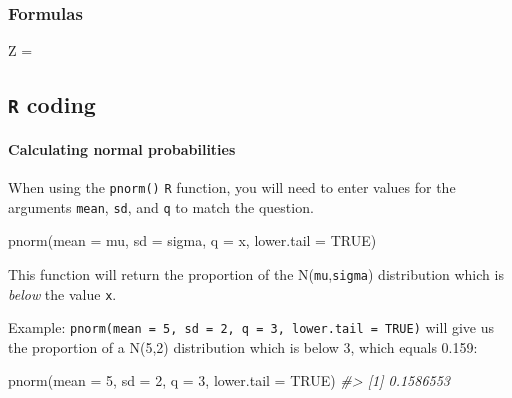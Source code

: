 \documentclass[
]{report}
\newenvironment{Shaded}{\begin{snugshade}}{\end{snugshade}}
\newcommand{\AttributeTok}[1]{\textcolor[rgb]{0.77,0.63,0.00}{#1}}
\newcommand{\CommentTok}[1]{\textcolor[rgb]{0.56,0.35,0.01}{\textit{#1}}}
\newcommand{\ConstantTok}[1]{\textcolor[rgb]{0.00,0.00,0.00}{#1}}
\newcommand{\DecValTok}[1]{\textcolor[rgb]{0.00,0.00,0.81}{#1}}
\newcommand{\FunctionTok}[1]{\textcolor[rgb]{0.00,0.00,0.00}{#1}}
\newcommand{\NormalTok}[1]{#1}
\newcommand{\rgs}{\vspace{12pt}} %
\begin{document}
\hypertarget{formulas-1}{%
\subsubsection*{Formulas}\label{formulas-1}}

Z =
\rgs

\hypertarget{r-coding}{%
\subsection*{\texorpdfstring{\texttt{R} coding}{R coding}}\label{r-coding}}

\hypertarget{calculating-normal-probabilities}{%
\paragraph*{Calculating normal probabilities}\label{calculating-normal-probabilities}}

When using the \texttt{pnorm()} \texttt{R} function, you will need to enter values for the arguments \texttt{mean}, \texttt{sd}, and \texttt{q} to match the question.

\begin{Shaded}
\begin{Highlighting}[]
\FunctionTok{pnorm}\NormalTok{(}\AttributeTok{mean =}\NormalTok{ mu, }\AttributeTok{sd =}\NormalTok{ sigma, }\AttributeTok{q =}\NormalTok{ x, }\AttributeTok{lower.tail =} \ConstantTok{TRUE}\NormalTok{)}
\end{Highlighting}
\end{Shaded}

This function will return the proportion of the N(\texttt{mu},\texttt{sigma}) distribution which is \emph{below} the value \texttt{x}.

Example: \texttt{pnorm(mean\ =\ 5,\ sd\ =\ 2,\ q\ =\ 3,\ lower.tail\ =\ TRUE)} will give us the proportion of a N(5,2) distribution which is below 3, which equals 0.159:

\begin{Shaded}
\begin{Highlighting}[]
\FunctionTok{pnorm}\NormalTok{(}\AttributeTok{mean =} \DecValTok{5}\NormalTok{, }\AttributeTok{sd =} \DecValTok{2}\NormalTok{, }\AttributeTok{q =} \DecValTok{3}\NormalTok{, }\AttributeTok{lower.tail =} \ConstantTok{TRUE}\NormalTok{)}
\CommentTok{\#\textgreater{} [1] 0.1586553}
\end{Highlighting}
\end{Shaded}
\end{document}
